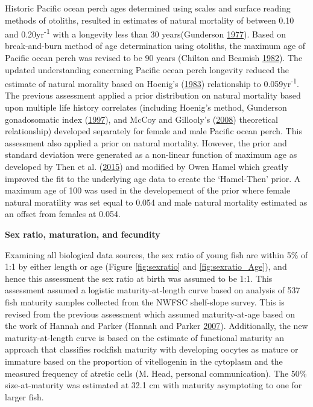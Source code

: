 \documentclass[12pt,]{article}
\begin{document}
Historic Pacific ocean perch ages determined using scales and surface
reading methods of otoliths, resulted in estimates of natural mortality
of between 0.10 and 0.20yr\textsuperscript{-1} with a longevity less
than 30 years(Gunderson
\protect\hyperlink{ref-gunderson_population_1977}{1977}). Based on
break-and-burn method of age determination using otoliths, the maximum
age of Pacific ocean perch was revised to be 90 years (Chilton and
Beamish \protect\hyperlink{ref-chilton_age_1982}{1982}). The updated
understanding concerning Pacific ocean perch longevity reduced the
estimate of natural morality based on Hoenig's
(\protect\hyperlink{ref-hoenig_empirical_1983}{1983}) relationship to
0.059yr\textsuperscript{-1}. The previous assessment applied a prior
distribution on natural mortality based upon multiple life history
correlates (including Hoenig's method, Gunderson gonadosomatic index
(\protect\hyperlink{ref-gunderson_trade-off_1997}{1997}), and McCoy and
Gillooly's (\protect\hyperlink{ref-mccoy_predicting_2008}{2008})
theoretical relationship) developed separately for female and male
Pacific ocean perch. This assessment also applied a prior on natural
mortality. However, the prior and standard deviation were generated as a
non-linear function of maximum age as developed by Then et al.
(\protect\hyperlink{ref-then_evaluating_2015}{2015}) and modified by
Owen Hamel which greatly improved the fit to the underlying age data to
create the `Hamel-Then' prior. A maximum age of 100 was used in the
developement of the prior where female natural moratility was set equal
to 0.054 and male natural mortality estimated as an offset from females
at 0.054.

\vspace{.5cm}

\textbf{Sex ratio, maturation, and fecundity}

Examining all biological data sources, the sex ratio of young fish are
within 5\% of 1:1 by either length or age (Figure \ref{fig:sexratio} and
\ref{fig:sexratio_Age}), and hence this assessment the sex ratio at
birth was assumed to be 1:1. This assessment assumed a logistic
maturity-at-length curve based on analysis of 537 fish maturity samples
collected from the NWFSC shelf-slope survey. This is revised from the
previous assessment which assumed maturity-at-age based on the work of
Hannah and Parker (Hannah and Parker
\protect\hyperlink{ref-hannah_age-modulated_2007}{2007}). Additionally,
the new maturity-at-length curve is based on the estimate of functional
maturity an approach that classifies rockfish maturity with developing
oocytes as mature or immature based on the proportion of vitellogenin in
the cytoplasm and the measured frequency of atretic cells (M. Head,
personal communication). The 50\% size-at-maturity was estimated at 32.1
cm with maturity asymptoting to one for larger fish.
\end{document}
